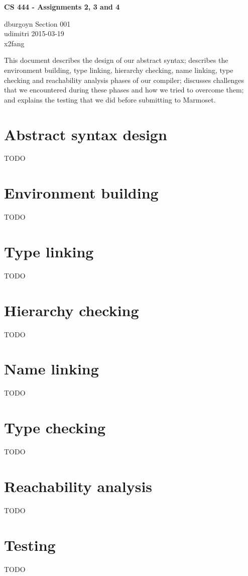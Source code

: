 \documentclass[12pt]{article}
\begin{document}
\begin{center}
\textbf{\large{}CS 444 - Assignments 2, 3 and 4}
\end{center}

\begin{flushleft}
dburgoyn \textbf{\hfill{}} Section 001 \\
udimitri \textbf{\hfill{}} 2015-03-19 \\
x2fang \\
\end{flushleft}


This document describes the design of our abstract syntax; describes the environment building, type linking, hierarchy checking, name linking, type checking and reachability analysis phases of our compiler; discusses challenges that we encountered during these phases and how we tried to overcome them; and explains the testing that we did before submitting to Marmoset.

\section{Abstract syntax design}

TODO

\section{Environment building}

TODO

\section{Type linking}

TODO

\section{Hierarchy checking}

TODO

\section{Name linking}

TODO

\section{Type checking}

TODO

\section{Reachability analysis}

TODO

\section{Testing}

TODO
\end{document}
